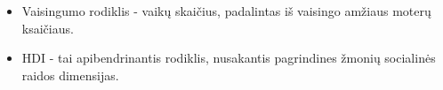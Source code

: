 \begin{itemize}
    \item Vaisingumo rodiklis - vaikų skaičius, padalintas iš vaisingo amžiaus moterų ksaičiaus.
    \item HDI - tai apibendrinantis rodiklis, nusakantis pagrindines žmonių socialinės raidos dimensijas.
\end{itemize}